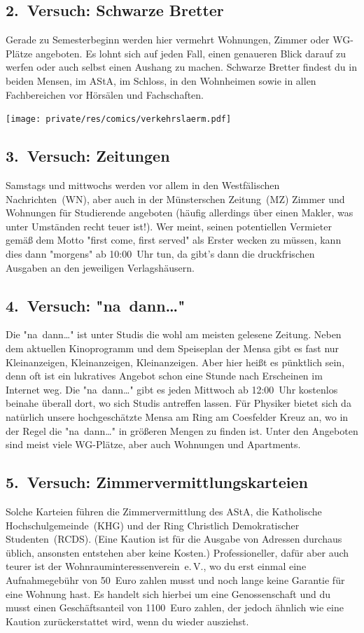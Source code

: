 \begin{multicols*}{2}
\subsection{2.~Versuch: Schwarze Bretter}
Gerade zu Semesterbeginn werden hier vermehrt Wohnungen, Zimmer oder WG-Plätze angeboten.
Es lohnt sich auf jeden Fall, einen genaueren Blick darauf zu werfen oder auch selbst einen Aushang zu machen.
Schwarze Bretter findest du in beiden Mensen, im AStA, im Schloss, in den Wohnheimen sowie in allen Fachbereichen vor Hörsälen und Fachschaften.
\begin{center}
	\texttt{[image: private/res/comics/verkehrslaerm.pdf]}
\end{center}

\subsection*{3.~Versuch: Zeitungen}
Samstags und mittwochs werden vor allem in den Westfälischen Nachrichten~(WN), aber auch in der Münsterschen Zeitung~(MZ) Zimmer und Wohnungen für Studierende angeboten (häufig allerdings über einen Makler, was unter Umständen recht teuer ist!).
Wer meint, seinen potentiellen Vermieter gemäß dem Motto "\foreignlanguage{english}{first come, first served}" als Erster wecken zu müssen, kann dies dann "morgens" ab 10:00~Uhr tun, da gibt's dann die druckfrischen Ausgaben an den jeweiligen Verlagshäusern.

\subsection{4.~Versuch: "na~dann\dots"}
Die "na~dann\dots" ist unter Studis die wohl am meisten gelesene Zeitung.
Neben dem aktuellen Kinoprogramm und dem Speiseplan der Mensa gibt es fast nur Kleinanzeigen, Kleinanzeigen, Kleinanzeigen.
Aber hier heißt es pünktlich sein, denn oft ist ein lukratives Angebot schon eine Stunde nach Erscheinen im Internet weg.
Die "na~dann\dots" gibt es jeden Mittwoch ab 12:00~Uhr kostenlos beinahe überall dort, wo sich Studis antreffen lassen.
Für Physiker bietet sich da natürlich unsere hochgeschätzte Mensa am Ring am Coesfelder Kreuz an, wo in der Regel die "na~dann\dots" in größeren Mengen zu finden ist.
Unter den Angeboten sind meist viele WG-Plätze, aber auch Wohnungen und Apartments.

\subsection{5.~Versuch: Zimmervermittlungskarteien}
Solche Karteien führen die Zimmervermittlung des AStA, die Katholische Hochschulgemeinde~(KHG) und der Ring Christlich Demokratischer Studenten~(RCDS).
(Eine Kaution ist für die Ausgabe von Adressen durchaus üblich, ansonsten entstehen aber keine Kosten.)
Professioneller, dafür aber auch teurer ist der Wohnrauminteressenverein~e.\,V., wo du erst einmal eine Aufnahmegebühr von 50~Euro zahlen musst und noch lange keine Garantie für eine Wohnung hast.
Es handelt sich hierbei um eine Genossenschaft und du musst einen Geschäftsanteil von 1100~Euro zahlen, der jedoch ähnlich wie eine Kaution zurückerstattet wird, wenn du wieder ausziehst.


\end{multicols*}
